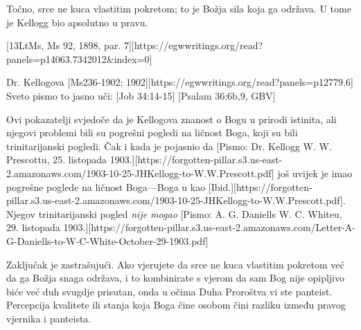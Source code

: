 Točno, srce ne kuca vlastitim pokretom; to je Božja sila koja ga održava. U tome je Kellogg bio apsolutno u pravu.

[13LtMs, Ms 92, 1898, par. 7][https://egwwritings.org/read?panels=p14063.7342012&index=0]

Dr. Kellogova [Ms236-1902; 1902][https://egwwritings.org/read?panels=p12779.6] Sveto pismo to jasno uči: [Job 34:14-15] [Psalam 36:6b,9, GBV]

Ovi pokazatelji svjedoče da je Kellogova znanost o Bogu u prirodi istinita, ali njegovi problemi bili su pogrešni pogledi na ličnost Boga, koji su bili trinitarijanski pogledi. Čak i kada je pojasnio da [Pismo: Dr. Kellogg W. W. Prescottu, 25. listopada 1903.][https://forgotten-pillar.s3.us-east-2.amazonaws.com/1903-10-25-JHKellogg-to-W.W.Prescott.pdf] još uvijek je imao pogrešne poglede na ličnost Boga—Boga u  kao [Ibid.][https://forgotten-pillar.s3.us-east-2.amazonaws.com/1903-10-25-JHKellogg-to-W.W.Prescott.pdf]. Njegov trinitarijanski pogled \textit{nije mogao} [Pismo: A. G. Daniells W. C. Whiteu, 29. listopada 1903.][https://forgotten-pillar.s3.us-east-2.amazonaws.com/Letter-A-G-Daniells-to-W-C-White-October-29-1903.pdf]

Zaključak je zastrašujući. Ako vjerujete da srce ne kuca vlastitim pokretom već da ga Božja snaga održava, i to kombinirate s vjerom da sam Bog nije opipljivo biće već duh svugdje prisutan, onda u očima Duha Proroštva vi ste panteist. Percepcija kvalitete ili stanja koja Boga čine osobom čini razliku između pravog vjernika i panteista.

